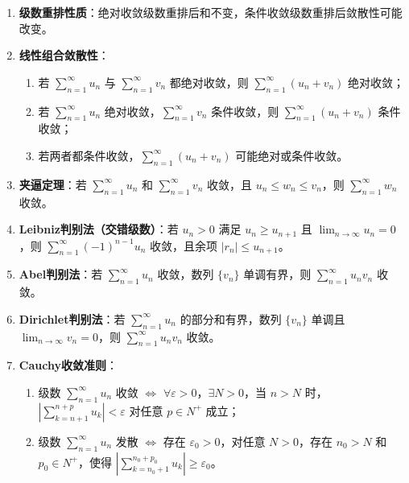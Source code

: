 \documentclass[UTF8]{ctexart}
\theoremstyle{remark}
\begin{document}
\begin{enumerate}
	\item \textbf{级数重排性质}：绝对收敛级数重排后和不变，条件收敛级数重排后敛散性可能改变。
	
	\item \textbf{线性组合敛散性}：
	\begin{enumerate}
		\item 若 \(\sum_{n=1}^{\infty} u_n\) 与 \(\sum_{n=1}^{\infty} v_n\) 都绝对收敛，则 \(\sum_{n=1}^{\infty} (u_n + v_n)\) 绝对收敛；
		\item 若 \(\sum_{n=1}^{\infty} u_n\) 绝对收敛，\(\sum_{n=1}^{\infty} v_n\) 条件收敛，则 \(\sum_{n=1}^{\infty} (u_n + v_n)\) 条件收敛；
		\item 若两者都条件收敛，\(\sum_{n=1}^{\infty} (u_n + v_n)\) 可能绝对或条件收敛。
	\end{enumerate}
	
	\item \textbf{夹逼定理}：若 \(\sum_{n=1}^{\infty} u_n\) 和 \(\sum_{n=1}^{\infty} v_n\) 收敛，且 \(u_n \leq w_n \leq v_n\)，则 \(\sum_{n=1}^{\infty} w_n\) 收敛。
	
	\item \textbf{Leibniz判别法（交错级数）}：若 \(u_n > 0\) 满足 \(u_n \geq u_{n+1}\) 且 \(\lim_{n \to \infty} u_n = 0\)，则 \(\sum_{n=1}^{\infty} (-1)^{n-1} u_n\) 收敛，且余项 \(|r_n| \leq u_{n+1}\)。
	
	\item \textbf{Abel判别法}：若 \(\sum_{n=1}^{\infty} u_n\) 收敛，数列 \(\{v_n\}\) 单调有界，则 \(\sum_{n=1}^{\infty} u_n v_n\) 收敛。
	
	\item \textbf{Dirichlet判别法}：若 \(\sum_{n=1}^{\infty} u_n\) 的部分和有界，数列 \(\{v_n\}\) 单调且 \(\lim_{n \to \infty} v_n = 0\)，则 \(\sum_{n=1}^{\infty} u_n v_n\) 收敛。
	
	\item \textbf{Cauchy收敛准则}：
	\begin{enumerate}
		\item 级数 \(\sum_{n=1}^{\infty} u_n\) 收敛 \(\Leftrightarrow\) \(\forall \varepsilon > 0\)，\(\exists N > 0\)，当 \(n > N\) 时，\(|\sum_{k=n+1}^{n+p} u_k| < \varepsilon\) 对任意 \(p \in N^+\) 成立；
		\item 级数 \(\sum_{n=1}^{\infty} u_n\) 发散 \(\Leftrightarrow\) 存在 \(\varepsilon_0 > 0\)，对任意 \(N > 0\)，存在 \(n_0 > N\) 和 \(p_0 \in N^+\)，使得 \(|\sum_{k=n_0+1}^{n_0+p_0} u_k| \geq \varepsilon_0\)。
	\end{enumerate}



\end{enumerate}
\end{document}
